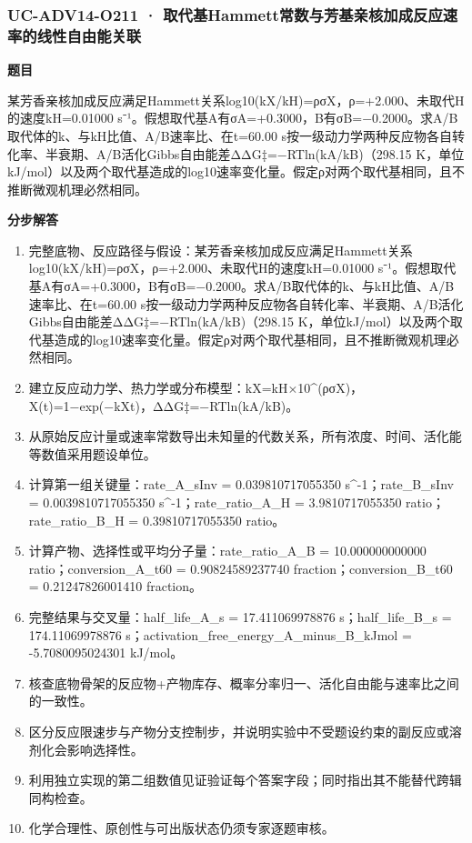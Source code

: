 \documentclass[UTF8,11pt,a4paper]{ctexart}
\begin{document}
\subsubsection*{UC-ADV14-O211 · 取代基Hammett常数与芳基亲核加成反应速率的线性自由能关联}
\noindent\textbf{题目}\par
某芳香亲核加成反应满足Hammett关系log10(kX/kH)=ρσX，ρ=+2.000、未取代H的速度kH=0.01000 s⁻¹。假想取代基A有σA=+0.3000，B有σB=−0.2000。求A/B取代体的k、与kH比值、A/B速率比、在t=60.00 s按一级动力学两种反应物各自转化率、半衰期、A/B活化Gibbs自由能差ΔΔG‡=−RTln(kA/kB)（298.15 K，单位kJ/mol）以及两个取代基造成的log10速率变化量。假定ρ对两个取代基相同，且不推断微观机理必然相同。\par
\medskip\noindent\textbf{分步解答}
\begin{enumerate}
\item 完整底物、反应路径与假设：某芳香亲核加成反应满足Hammett关系log10(kX/kH)=ρσX，ρ=+2.000、未取代H的速度kH=0.01000 s⁻¹。假想取代基A有σA=+0.3000，B有σB=−0.2000。求A/B取代体的k、与kH比值、A/B速率比、在t=60.00 s按一级动力学两种反应物各自转化率、半衰期、A/B活化Gibbs自由能差ΔΔG‡=−RTln(kA/kB)（298.15 K，单位kJ/mol）以及两个取代基造成的log10速率变化量。假定ρ对两个取代基相同，且不推断微观机理必然相同。
\item 建立反应动力学、热力学或分布模型：kX=kH×10\textasciicircum{}(ρσX)，X(t)=1−exp(−kXt)，ΔΔG‡=−RTln(kA/kB)。
\item 从原始反应计量或速率常数导出未知量的代数关系，所有浓度、时间、活化能等数值采用题设单位。
\item 计算第一组关键量：rate\_A\_sInv = 0.039810717055350 s\textasciicircum{}-1；rate\_B\_sInv = 0.0039810717055350 s\textasciicircum{}-1；rate\_ratio\_A\_H = 3.9810717055350 ratio；rate\_ratio\_B\_H = 0.39810717055350 ratio。
\item 计算产物、选择性或平均分子量：rate\_ratio\_A\_B = 10.000000000000 ratio；conversion\_A\_t60 = 0.90824589237740 fraction；conversion\_B\_t60 = 0.21247826001410 fraction。
\item 完整结果与交叉量：half\_life\_A\_s = 17.411069978876 s；half\_life\_B\_s = 174.11069978876 s；activation\_free\_energy\_A\_minus\_B\_kJmol = -5.7080095024301 kJ/mol。
\item 核查底物骨架的反应物+产物库存、概率分率归一、活化自由能与速率比之间的一致性。
\item 区分反应限速步与产物分支控制步，并说明实验中不受题设约束的副反应或溶剂化会影响选择性。
\item 利用独立实现的第二组数值见证验证每个答案字段；同时指出其不能替代跨辑同构检查。
\item 化学合理性、原创性与可出版状态仍须专家逐题审核。
\end{enumerate}
\end{document}
